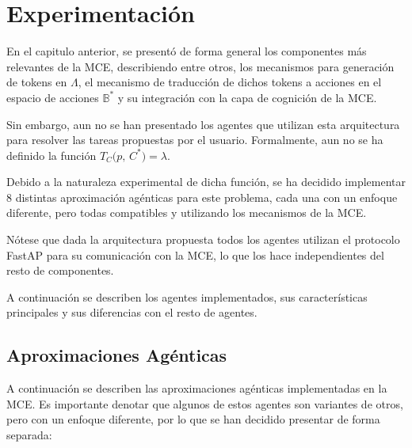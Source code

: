 \chapter{Experimentación}
En el capitulo anterior, se presentó de forma general los componentes
más relevantes de la MCE, describiendo entre otros, los mecanismos
para generación de tokens en \(\Lambda\), el mecanismo de traducción
de dichos tokens a acciones en el espacio de acciones \(\mathbb{B}^*\)
y su integración con la capa de cognición de la MCE. 

Sin embargo, aun no se han presentado los agentes que utilizan
esta arquitectura para resolver las tareas propuestas por el usuario.
Formalmente, aun no se ha definido la función \(T_C\bigl(p,\,C^*\bigr) = \lambda\).

Debido a la naturaleza experimental de dicha función, se ha decidido
implementar 8 distintas aproximación agénticas para este problema,
cada una con un enfoque diferente, pero todas compatibles y utilizando
los mecanismos de la MCE.

Nótese que dada la arquitectura propuesta todos los agentes utilizan
el protocolo FastAP para su comunicación con la MCE, lo que los hace
independientes del resto de componentes.

A continuación se describen los agentes implementados, sus
características principales y sus diferencias con el resto de
agentes.

\section{Aproximaciones Agénticas}

A continuación se describen las aproximaciones agénticas
implementadas en la MCE. Es importante denotar que algunos de
estos agentes son variantes de otros, pero con un enfoque
diferente, por lo que se han decidido presentar de forma
separada:

